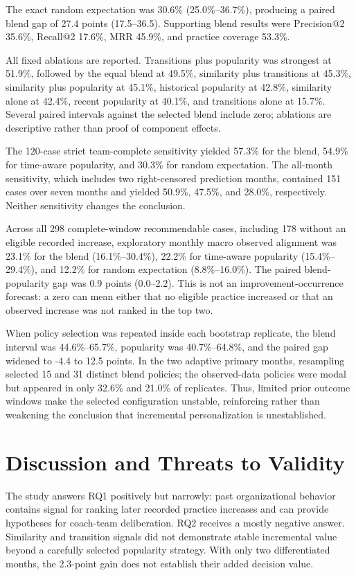 \documentclass[runningheads]{llncs}
\begin{document}
The exact random expectation was 30.6\% (25.0\%--36.7\%), producing a paired blend gap of 27.4 points (17.5--36.5). Supporting blend results were Precision@2 35.6\%, Recall@2 17.6\%, MRR 45.9\%, and practice coverage 53.3\%.

All fixed ablations are reported. Transitions plus popularity was strongest at 51.9\%, followed by the equal blend at 49.5\%, similarity plus transitions at 45.3\%, similarity plus popularity at 45.1\%, historical popularity at 42.8\%, similarity alone at 42.4\%, recent popularity at 40.1\%, and transitions alone at 15.7\%. Several paired intervals against the selected blend include zero; ablations are descriptive rather than proof of component effects.

The 120-case strict team-complete sensitivity yielded 57.3\% for the blend, 54.9\% for time-aware popularity, and 30.3\% for random expectation. The all-month sensitivity, which includes two right-censored prediction months, contained 151 cases over seven months and yielded 50.9\%, 47.5\%, and 28.0\%, respectively. Neither sensitivity changes the conclusion.

Across all 298 complete-window recommendable cases, including 178 without an eligible recorded increase, exploratory monthly macro observed alignment was 23.1\% for the blend (16.1\%--30.4\%), 22.2\% for time-aware popularity (15.4\%--29.4\%), and 12.2\% for random expectation (8.8\%--16.0\%). The paired blend-popularity gap was 0.9 points (0.0--2.2). This is not an improvement-occurrence forecast: a zero can mean either that no eligible practice increased or that an observed increase was not ranked in the top two.

When policy selection was repeated inside each bootstrap replicate, the blend interval was 44.6\%--65.7\%, popularity was 40.7\%--64.8\%, and the paired gap widened to -4.4 to 12.5 points. In the two adaptive primary months, resampling selected 15 and 31 distinct blend policies; the observed-data policies were modal but appeared in only 32.6\% and 21.0\% of replicates. Thus, limited prior outcome windows make the selected configuration unstable, reinforcing rather than weakening the conclusion that incremental personalization is unestablished.

\section{Discussion and Threats to Validity}

The study answers RQ1 positively but narrowly: past organizational behavior contains signal for ranking later recorded practice increases and can provide hypotheses for coach-team deliberation. RQ2 receives a mostly negative answer. Similarity and transition signals did not demonstrate stable incremental value beyond a carefully selected popularity strategy. With only two differentiated months, the 2.3-point gain does not establish their added decision value.
\end{document}
